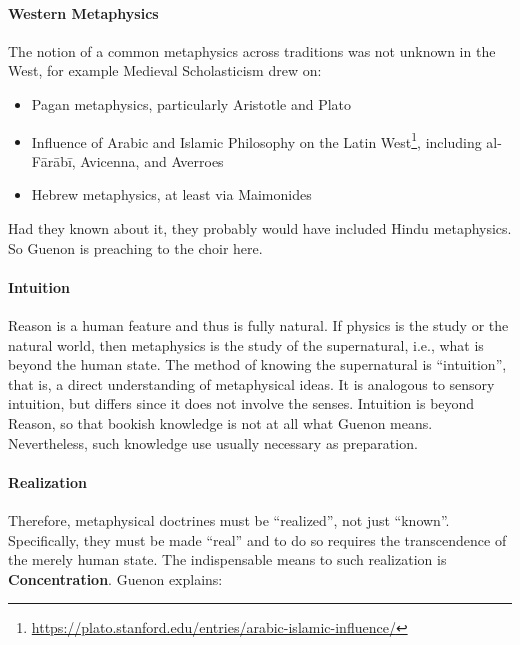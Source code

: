 \paragraph{Western Metaphysics}
The notion of a common metaphysics across traditions was not unknown in the West, for example Medieval Scholasticism drew on:

\begin{itemize}
\item Pagan metaphysics, particularly Aristotle and Plato 
\item Influence of Arabic and Islamic Philosophy on the Latin West\footnote{\url{https://plato.stanford.edu/entries/arabic-islamic-influence/}}, including al-Fārābī, Avicenna, and Averroes 
\item Hebrew metaphysics, at least via Maimonides 
\end{itemize}
Had they known about it, they probably would have included Hindu metaphysics. So Guenon is preaching to the choir here.

\paragraph{Intuition}
Reason is a human feature and thus is fully natural. If physics is the study or the natural world, then metaphysics is the study of the supernatural, i.e., what is beyond the human state. The method of knowing the supernatural is “intuition”, that is, a direct understanding of metaphysical ideas. It is analogous to sensory intuition, but differs since it does not involve the senses. Intuition is beyond Reason, so that bookish knowledge is not at all what Guenon means. Nevertheless, such knowledge use usually necessary as preparation.

\paragraph{Realization}
Therefore, metaphysical doctrines must be “realized”, not just “known”. Specifically, they must be made “real” and to do so requires the transcendence of the merely human state. The indispensable means to such realization is \textbf{Concentration}. Guenon explains:


